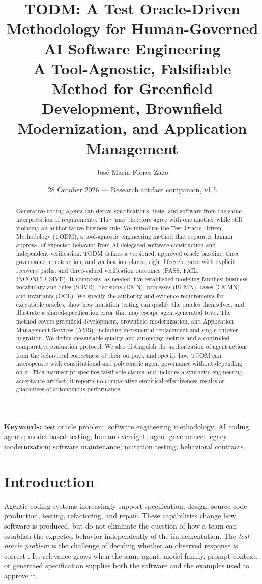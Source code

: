 \documentclass[11pt,a4paper]{article}
\title{\textbf{TODM: A Test Oracle-Driven Methodology for Human-Governed AI Software Engineering}\\[5pt]\large A Tool-Agnostic, Falsifiable Method for Greenfield Development, Brownfield Modernization, and Application Management}
\author{Jos\'e Mar\'ia Flores Zazo}
\date{28 October 2026 --- Research artifact companion, v1.5}
\begin{document}
\maketitle
\vspace{-1.3em}
\begin{abstract}
Generative coding agents can derive specifications, tests, and software from the same interpretation of requirements. They may therefore agree with one another while still violating an authoritative business rule. We introduce the Test Oracle-Driven Methodology (TODM), a tool-agnostic engineering method that separates human approval of expected behavior from AI-delegated software construction and independent verification. TODM defines a versioned, approved oracle baseline; three governance, construction, and verification planes; eight lifecycle gates with explicit recovery paths; and three-valued verification outcomes (PASS, FAIL, INCONCLUSIVE). It composes, as needed, five established modeling families: business vocabulary and rules (SBVR), decisions (DMN), processes (BPMN), cases (CMMN), and invariants (OCL). We specify the authority and evidence requirements for executable oracles, show how mutation testing can qualify the oracles themselves, and illustrate a shared-specification error that may escape agent-generated tests. The method covers greenfield development, brownfield modernization, and Application Management Services (AMS), including incremental replacement and single-cutover migration. We define measurable quality and autonomy metrics and a controlled comparative evaluation protocol. We also distinguish the authorization of agent actions from the behavioral correctness of their outputs, and specify how TODM can interoperate with constitutional and polycentric agent governance without depending on it. This manuscript specifies falsifiable claims and includes a synthetic engineering acceptance artifact; it reports no comparative empirical effectiveness results or guarantees of autonomous performance.
\end{abstract}
\noindent\textbf{Keywords:} test oracle problem; software engineering methodology; AI coding agents; model-based testing; human oversight; agent governance; legacy modernization; software maintenance; mutation testing; behavioral contracts.

\section{Introduction}
Agentic coding systems increasingly support specification, design, source-code production, testing, refactoring, and repair. These capabilities change how software is produced, but do not eliminate the question of how a team can establish the expected behavior independently of the implementation. The \emph{test oracle problem} is the challenge of deciding whether an observed response is correct \cite{barr2015oracle}. Its relevance grows when the same agent, model family, prompt context, or generated specification supplies both the software and the examples used to approve it.
\end{document}
